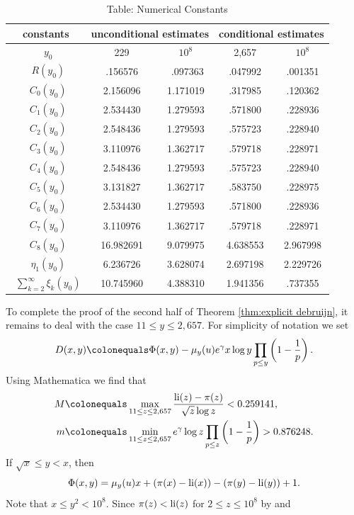 \documentclass[12pt,reqno]{amsart}
\begin{document}
\begin{table}[ht]
\caption*{Table: Numerical Constants}
\begin{tabular}{| *{5}{c|} }
	\hline
	constants    & \multicolumn{2}{c|}{unconditional estimates}
	& \multicolumn{2}{c|}{conditional estimates}       \\ \hline
	
~$y_0$ &~229 &~$10^8$&~2{,}657&~$10^8$\\
~$R(y_0)$ &~.156576 &~ .097363&~.047992 &~.001351\\
~$C_0(y_0)$ &~2.156096 &~1.171019&~.317985 &~.120362\\
~$C_1(y_0)$ &~2.534430  &~1.279593&~.571800 &~.228936\\
~$C_2(y_0)$ &~2.548436  &~1.279593&~.575723 &~.228940\\
~$C_3(y_0)$ &~3.110976&~1.362717&~.579718 &~.228971\\
~$C_4(y_0)$ &~2.548436  &~1.279593&~.575723 &~.228940\\
~$C_5(y_0)$ &~3.131827&~1.362717&~.583750 &~.228975\\
~$C_6(y_0)$ &~2.534430 &~1.279593&~.571800 &~.228936\\
~$C_7(y_0)$ &~3.110976 &~1.362717&~.579718 &~.228971\\
~$C_8(y_0)$ &~16.982691 &~9.079975&~4.638553&~2.967998\\
~$\eta_1(y_0)$ &~6.236726&~3.628074&~2.697198 &~2.229726\\
~$\sum_{k=2}^{\infty}\xi_k(y_0)$ &~10.745960&~4.388310 &~1.941356 &~.737355\\\hline
\end{tabular}
\end{table}
\FloatBarrier
\par To complete the proof of the second half of Theorem \ref{thm:explicit debruijn}, it remains to deal with the case $11\le y\le 2{,}657$. For simplicity of notation we set
\[D(x,y)\colonequals\Phi(x,y)-\mu_y(u)e^{\gamma}x\log y\prod_{p\leq y}\left(1-\frac{1}{p}\right).\]
Using Mathematica we find that
\begin{align*}
M&\colonequals\max\limits_{11\le z\le 2{,}657}\frac{\li(z)-\pi(z)}{\sqrt{z}\log z}<0.259141,\\
m&\colonequals\min\limits_{11\le z\le 2{,}657} e^{\gamma}\log z\prod_{p\le z}\left(1-\frac{1}{p}\right)>0.876248.
\end{align*}
If $\sqrt{x}\le y<x$, then 
\[\Phi(x,y)=\mu_y(u)x+(\pi(x)-\operatorname{li}(x))-(\pi(y)-\operatorname{li}(y))+1.\]
Note that $x\le y^2<10^{8}$. Since $\pi(z)<\operatorname{li}(z)$ for $2\le z\le10^{8}$ by \cite[Theorem 16]{RS} and  
\end{document}
